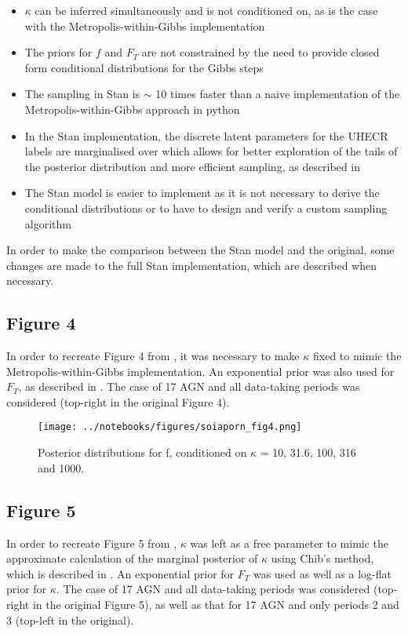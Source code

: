 \documentclass[fontsize=12pt]{article}
\begin{document}
\begin{itemize}
\item $\kappa$ can be inferred simultaneously and is not conditioned on, as is the case with the Metropolis-within-Gibbs implementation
\item The priors for $f$ and $F_T$ are not constrained by the need to provide closed form conditional distributions for the Gibbs steps
\item The sampling in Stan is $\sim$ 10 times faster than a naive implementation of the Metropolis-within-Gibbs approach in python 
\item In the Stan implementation, the discrete latent parameters for the UHECR labels are marginalised over which allows for better exploration of the tails of the posterior distribution and more efficient sampling, as described in \cite{stan_manual}
\item The Stan model is easier to implement as it is not necessary to derive the conditional distributions or to have to design and verify a custom sampling algorithm   
\end{itemize} 

In order to make the comparison between the Stan model and the original, some changes are made to the full Stan implementation, which are described when necessary.

\subsection{Figure 4}

In order to recreate Figure 4 from \cite{soiaporn}, it was necessary to make $\kappa$ fixed to mimic the Metropolis-within-Gibbs implementation. An exponential prior was also used for $F_T$, as described in \cite{soiaporn}. The case of 17 AGN and all data-taking periods was considered (top-right in the original Figure 4). 

\begin{figure}[h]
\centering
\texttt{[image: ../notebooks/figures/soiaporn\_fig4.png]}
\caption{Posterior distributions for f, conditioned on $\kappa$ = 10, 31.6, 100, 316 and 1000.}
\end{figure}

\subsection{Figure 5}

In order to recreate Figure 5 from \cite{soiaporn}, $\kappa$ was left as a free parameter to mimic the approximate calculation of the marginal posterior of $\kappa$ using Chib's method, which is described in \cite{soiaporn}. An exponential prior for $F_T$ was used as well as a log-flat prior for $\kappa$. The case of 17 AGN and all data-taking periods was considered (top-right in the original Figure 5), as well as that for 17 AGN and only periods 2 and 3 (top-left in the original). 
\end{document}

